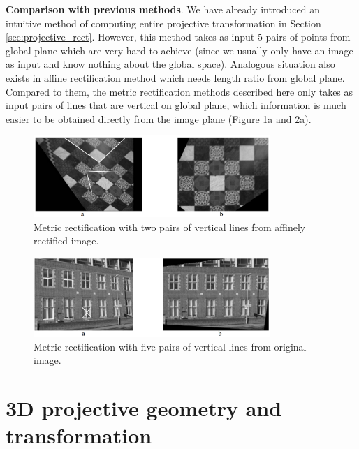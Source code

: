 \documentclass[12pt]{article}
\numberwithin{equation}{section}
\begin{document}
\textbf{Comparison with previous methods}. We have already introduced an intuitive method of computing entire projective transformation in Section \ref{sec:projective_rect}. However, this method takes as input 5 pairs of points from global plane which are very hard to achieve (since we usually only have an image as input and know nothing about the global space). Analogous situation also exists in affine rectification method which needs length ratio from global plane. Compared to them, the metric rectification methods described here only takes as input pairs of lines that are vertical on global plane, which information is much easier to be obtained directly from the image plane (Figure \ref{fig:metric_rect_01}a and \ref{fig:metric_rect_02}a).

\begin{figure}[h]
\begin{center}
\includegraphics[width=0.8\textwidth]{metric_rect01.png}
\end{center}
\caption{Metric rectification with two pairs of vertical lines from affinely rectified image.}
\label{fig:metric_rect_01}
\end{figure}

\begin{figure}[h]
\begin{center}
\includegraphics[width=0.8\textwidth]{metric_rect02.png}
\end{center}
\caption{Metric rectification with five pairs of vertical lines from original image.}
\label{fig:metric_rect_02}
\end{figure}

\clearpage

\section{3D projective geometry and transformation}
\end{document}
